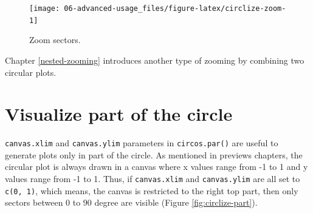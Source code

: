 \documentclass[]{book}
\newenvironment{Shaded}{\begin{snugshade}}{\end{snugshade}}
\newcommand{\KeywordTok}[1]{\textcolor[rgb]{0.13,0.29,0.53}{\textbf{#1}}}
\newcommand{\DataTypeTok}[1]{\textcolor[rgb]{0.13,0.29,0.53}{#1}}
\newcommand{\DecValTok}[1]{\textcolor[rgb]{0.00,0.00,0.81}{#1}}
\newcommand{\StringTok}[1]{\textcolor[rgb]{0.31,0.60,0.02}{#1}}
\newcommand{\OtherTok}[1]{\textcolor[rgb]{0.56,0.35,0.01}{#1}}
\newcommand{\NormalTok}[1]{#1}
\theoremstyle{definition}
\theoremstyle{definition}
\theoremstyle{remark}
\begin{document}
\begin{Shaded}
\end{Shaded}

\begin{figure}

{\centering \texttt{[image: 06-advanced-usage\_files/figure-latex/circlize-zoom-1]} 

}

\caption{Zoom sectors.}\label{fig:circlize-zoom}
\end{figure}

Chapter \ref{nested-zooming} introduces another type of zooming by
combining two circular plots.

\section{Visualize part of the circle}\label{part-circle}

\texttt{canvas.xlim} and \texttt{canvas.ylim} parameters in
\texttt{circos.par()} are useful to generate plots only in part of the
circle. As mentioned in previews chapters, the circular plot is always
drawn in a canvas where x values range from -1 to 1 and y values range
from -1 to 1. Thus, if \texttt{canvas.xlim} and \texttt{canvas.ylim} are
all set to \texttt{c(0,\ 1)}, which means, the canvas is restricted to
the right top part, then only sectors between 0 to 90 degree are visible
(Figure \ref{fig:circlize-part}).
\end{document}
